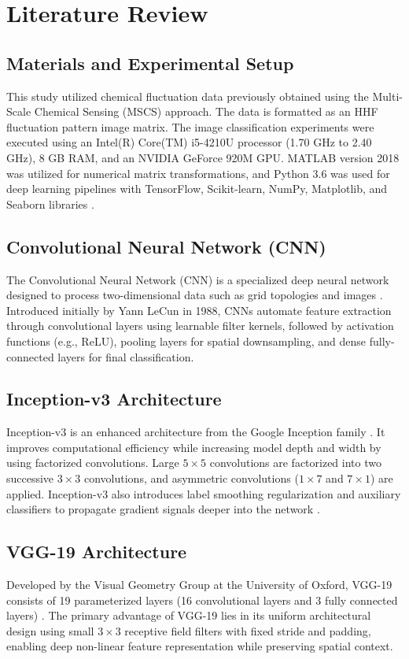 \documentclass[conference]{IEEEtran}
\begin{document}
\section{Literature Review}

\subsection{Materials and Experimental Setup}
This study utilized chemical fluctuation data previously obtained using the Multi-Scale Chemical Sensing (MSCS) approach. The data is formatted as an HHF fluctuation pattern image matrix. The image classification experiments were executed using an Intel(R) Core(TM) i5-4210U processor (1.70 GHz to 2.40 GHz), 8 GB RAM, and an NVIDIA GeForce 920M GPU. MATLAB version 2018 was utilized for numerical matrix transformations, and Python 3.6 was used for deep learning pipelines with TensorFlow, Scikit-learn, NumPy, Matplotlib, and Seaborn libraries \cite{ref34}.

\subsection{Convolutional Neural Network (CNN)}
The Convolutional Neural Network (CNN) is a specialized deep neural network designed to process two-dimensional data such as grid topologies and images \cite{ref35}. Introduced initially by Yann LeCun in 1988, CNNs automate feature extraction through convolutional layers using learnable filter kernels, followed by activation functions (e.g., ReLU), pooling layers for spatial downsampling, and dense fully-connected layers for final classification.

\subsection{Inception-v3 Architecture}
Inception-v3 is an enhanced architecture from the Google Inception family \cite{ref36}. It improves computational efficiency while increasing model depth and width by using factorized convolutions. Large $5\times 5$ convolutions are factorized into two successive $3\times 3$ convolutions, and asymmetric convolutions ($1\times 7$ and $7\times 1$) are applied. Inception-v3 also introduces label smoothing regularization and auxiliary classifiers to propagate gradient signals deeper into the network \cite{ref37}.

\subsection{VGG-19 Architecture}
Developed by the Visual Geometry Group at the University of Oxford, VGG-19 consists of 19 parameterized layers (16 convolutional layers and 3 fully connected layers) \cite{ref38}. The primary advantage of VGG-19 lies in its uniform architectural design using small $3\times 3$ receptive field filters with fixed stride and padding, enabling deep non-linear feature representation while preserving spatial context.
\end{document}
